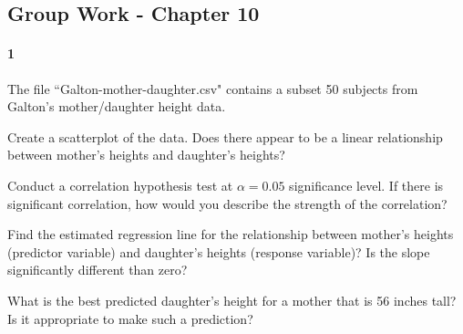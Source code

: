 \documentclass{article}
\begin{document}
\begin{flushleft}
\section*{Group Work - Chapter 10}
\paragraph{1} The file ``Galton-mother-daughter.csv" contains a subset 50 subjects from Galton's mother/daughter height data.
\begin{enumalpha}
\item Create a scatterplot of the data. Does there appear to be a linear relationship between mother's heights and daughter's heights?
\vspace{1.75in}
\item Conduct a correlation hypothesis test at $\alpha = 0.05$ significance level. If there is significant correlation, how would you describe the strength of the correlation?
\vspace{1.75in}
\item Find the estimated regression line for the relationship between mother's heights (predictor variable) and daughter's heights (response variable)? Is the slope significantly different than zero?
\vspace{1.75in}
\item What is the best predicted daughter's height for a mother that is 56 inches tall? Is it appropriate to make such a prediction?
\end{enumalpha}



\newpage

\end{flushleft}
\end{document}
